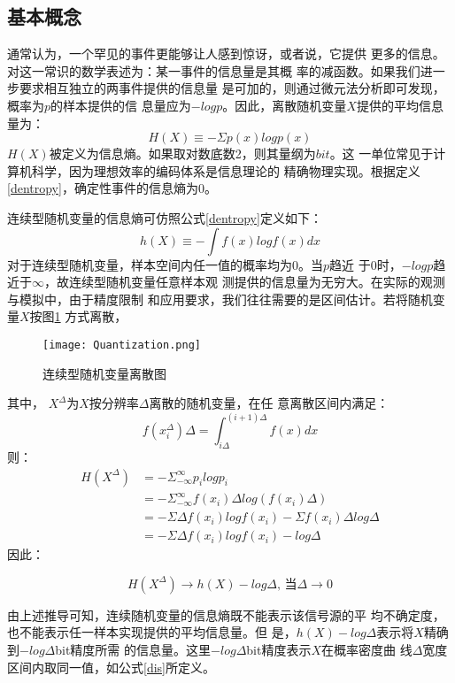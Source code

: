 \subsection{基本概念}
 
通常认为，一个罕见的事件更能够让人感到惊讶，或者说，它提供
更多的信息。对这一常识的数学表述为：某一事件的信息量是其概
率的减函数。如果我们进一步要求相互独立的两事件提供的信息量
是可加的，则通过微元法分析即可发现，概率为$p$的样本提供的信
息量应为$-logp$。因此，离散随机变量$X$提供的平均信息量为：
\begin{equation}
\label{dentropy}
H(X)\equiv-\Sigma p(x)logp(x)
\end{equation}
$H(X)$被定义为信息熵。如果取对数底数2，则其量纲为$bit$。这
一单位常见于计算机科学，因为理想效率的编码体系是信息理论的
精确物理实现。根据定义\ref{dentropy}，确定性事件的信息熵为$0$。


连续型随机变量的信息熵可仿照公式\ref{dentropy}定义如下：
\begin{equation}
\label{centropy}
h(X)\equiv-\int f(x)logf(x)dx
\end{equation} 
对于连续型随机变量，样本空间内任一值的概率均为0。当$p$趋近
于$0$时，$-logp$趋近于$\infty$，故连续型随机变量任意样本观
测提供的信息量为无穷大。在实际的观测与模拟中，由于精度限制
和应用要求，我们往往需要的是区间估计。若将随机变量$X$按图\ref{discretion}
方式离散，
\begin{figure}[H]
\centering
\texttt{[image: Quantization.png]}
\caption{连续型随机变量离散图}%
\label{discretion}
\end{figure}
其中， $X^\Delta$为$X$按分辨率$\Delta$离散的随机变量，在任
意离散区间内满足：
\begin{equation}
\label{dis}
f(x_i^\Delta)\Delta=\int_{i\Delta}^{(i+1)\Delta}f(x)dx
\end{equation} 
则：
\begin{equation} 
\label{quan}
\begin{split}
H(X^\Delta)&=-\Sigma_{-\infty}^{\infty}p_ilogp_i\\
&=-\Sigma_{-\infty}^{\infty}f(x_i)\Delta log(f
(x_i)\Delta)\\
&=-\Sigma\Delta f(x_i)logf(x_i)-\Sigma f(x_i)\Delta log
\Delta\\
&=-\Sigma\Delta f(x_i)logf(x_i)-log\Delta
\end{split}
\end{equation}
因此：
\begin{center}
\begin{equation}
\label{ddd}
 H(X^\Delta)\to h(X)-log\Delta \text{, 当}  \Delta \to 0 
\end{equation}
\end{center}
由上述推导可知，连续随机变量的信息熵既不能表示该信号源的平
均不确定度，也不能表示任一样本实现提供的平均信息量。但
是，$h(X)-log\Delta$表示将$X$精确到$-log\Delta$bit精度所需
的信息量\cite{cover2012elements}。这里$-log\Delta$bit精度表示$X$在概率密度曲
线$\Delta$宽度区间内取同一值，如公式\ref{dis}所定义。

